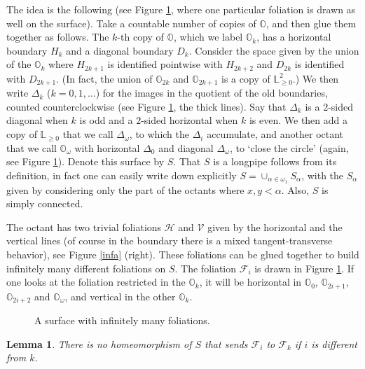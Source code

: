 \documentclass{amsart}
\newtheorem{lemma}[theorem]{Lemma}
\begin{document}
The idea is the following (see Figure \ref{infb}, where one particular foliation is drawn as well on the surface). Take a countable number of copies of ${\mathbb{O}}$, and then glue them together as follows. The $k$-th copy of ${\mathbb{O}}$, which we label ${\mathbb{O}}_k$, has a horizontal boundary $H_k$ and a diagonal boundary $D_k$. Consider the space given by the union of the ${\mathbb{O}}_k$ where $H_{2k+1}$ is identified pointwise with $H_{2k+2}$ and $D_{2k}$ is identified with $D_{2k+1}$. (In fact, the union of ${\mathbb{O}}_{2k}$ and ${\mathbb{O}}_{2k+1}$ is a copy of ${\mathbb{L}}_{\ge 0}^2$.) We then write $\Delta_k$ ($k=0,1,\dots$) for the images in the quotient of the old boundaries, counted counterclockwise (see Figure \ref{infb}, the thick lines). Say that $\Delta_k$ is a $2$-sided diagonal when $k$ is odd and a $2$-sided horizontal when $k$ is even. We then add a copy of ${\mathbb{L}}_{\ge 0}$ that we call $\Delta_\omega$, to which the $\Delta_i$ accumulate, and another octant that we call ${\mathbb{O}}_\omega$ with horizontal $\Delta_0$ and diagonal $\Delta_\omega$, to `close the circle' (again, see Figure \ref{infb}). Denote this surface by $S$. That $S$ is a longpipe follows from its definition, in fact one can easily write down explicitly $S=\cup_{\alpha\in\omega_1}S_\alpha$, with the $S_\alpha$ given by considering only the part of the octants where $x,y<\alpha$. Also, $S$ is simply connected.

The octant has two trivial foliations $\mathcal{H}$ and $\mathcal{V}$ given by the horizontal and the vertical lines (of course in the boundary there is a mixed tangent-transverse behavior), see Figure \ref{infa} (right). These foliations can be glued together to build infinitely many different foliations on $S$. The foliation $\mathcal F_i$ is drawn in Figure \ref{infb}. If one looks at the foliation restricted in the ${\mathbb{O}}_k$, it will be horizontal in ${\mathbb{O}}_0$, ${\mathbb{O}}_{2i+1}$, ${\mathbb{O}}_{2i+2}$ and ${\mathbb{O}}_\omega$, and vertical in the other ${\mathbb{O}}_k$.

\begin{figure}[h]
\centering
    \caption{\label{infb} A surface with infinitely many foliations.}
\end{figure}

\begin{lemma}\label{lemmainfty}
There is no homeomorphism of $S$ that sends $\mathcal F_i$ to $\mathcal F_k$ if $i$ is different from $k$. 
\end{lemma}
\end{document}
